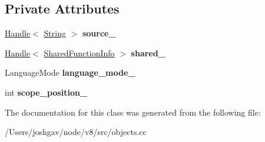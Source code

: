 \subsection*{Private Attributes}
\begin{DoxyCompactItemize}
\item 
\hyperlink{classv8_1_1internal_1_1_handle}{Handle}$<$ \hyperlink{classv8_1_1internal_1_1_string}{String} $>$ {\bfseries source\+\_\+}\hypertarget{classv8_1_1internal_1_1_string_shared_key_a65a5736b5636ba6bda94b9d92b05a6d0}{}\label{classv8_1_1internal_1_1_string_shared_key_a65a5736b5636ba6bda94b9d92b05a6d0}

\item 
\hyperlink{classv8_1_1internal_1_1_handle}{Handle}$<$ \hyperlink{classv8_1_1internal_1_1_shared_function_info}{Shared\+Function\+Info} $>$ {\bfseries shared\+\_\+}\hypertarget{classv8_1_1internal_1_1_string_shared_key_ac5f950683d8d27fdb2a8d420d13a3f34}{}\label{classv8_1_1internal_1_1_string_shared_key_ac5f950683d8d27fdb2a8d420d13a3f34}

\item 
Language\+Mode {\bfseries language\+\_\+mode\+\_\+}\hypertarget{classv8_1_1internal_1_1_string_shared_key_a59e1937f907250757b9800ef25aadb62}{}\label{classv8_1_1internal_1_1_string_shared_key_a59e1937f907250757b9800ef25aadb62}

\item 
int {\bfseries scope\+\_\+position\+\_\+}\hypertarget{classv8_1_1internal_1_1_string_shared_key_a6c218162ff9eb4091d0f2e8faf60e940}{}\label{classv8_1_1internal_1_1_string_shared_key_a6c218162ff9eb4091d0f2e8faf60e940}

\end{DoxyCompactItemize}


The documentation for this class was generated from the following file\+:\begin{DoxyCompactItemize}
\item 
/\+Users/joshgav/node/v8/src/objects.\+cc\end{DoxyCompactItemize}
